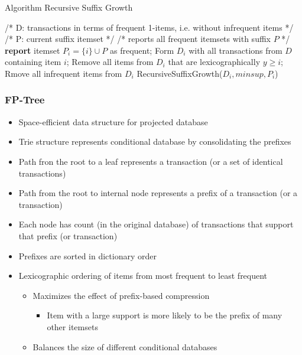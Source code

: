 \documentclass[../notes.tex]{subfiles}
\begin{document}
\newpage

\begin{algorithm}
\caption{Algorithm Recursive Suffix Growth}
\begin{algorithmic}[0]
\State /* D: transactions in terms of frequent 1-items, i.e. without infrequent items */
\State /* P: current suffix itemset */
\State /* reports all frequent itemsets with suffix $P$ */ \\

  \State \textbf{report} itemset $P_i = \{i\} \cup P$  as frequent;
  \State Form $D_i$ with all transactions from $D$ containing item $i$;
  \State Remove all items from $D_i$ that are lexicographically $y \ge i$;
  \State Rmove all infrequent items from $D_i$
    RecursiveSuffixGrowth($D_i, minsup, P_i$)
  \EndIf
\EndFor
\EndFunction
\end{algorithmic}
\end{algorithm}

\subsubsection{FP-Tree}
\begin{itemize}
  \item Space-efficient data structure for projected database
  \item Trie structure represents conditional database by consolidating the prefixes
  \item Path fron the root to a leaf represents a transaction (or a set of identical transactions)
  \item Path from the root to internal node represents a prefix of a transaction (or a transaction)
  \item Each node has count (in the original database) of transactions that support that prefix (or transaction)
  \item Prefixes are sorted in dictionary order
  \item Lexicographic ordering of items from most frequent to least frequent
  \begin{itemize}
    \item Maximizes the effect of prefix-based compression
      \begin{itemize}
        \item Item with a large support is more likely to be the prefix of many other itemsets
      \end{itemize}
    \item Balances the size of different conditional databases
  \end{itemize}
\end{itemize}
\end{document}
